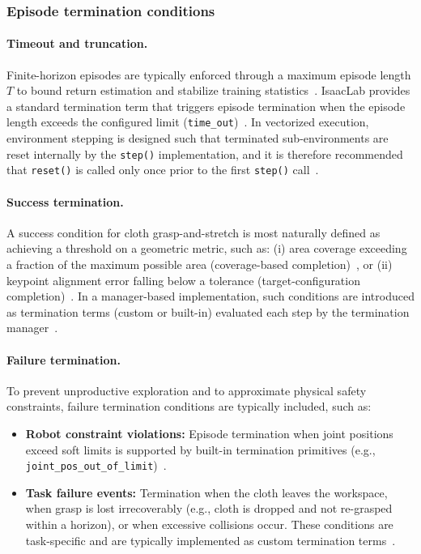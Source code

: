 \subsubsection{Episode termination conditions}

\paragraph{Timeout and truncation.}
Finite-horizon episodes are typically enforced through a maximum episode length $T$ to bound return estimation and stabilize training statistics~\cite{SuttonBarto2018}. IsaacLab provides a standard termination term that triggers episode termination when the episode length exceeds the configured limit (\texttt{time\_out})~\cite{isaaclab_mdp_terms_api}. In vectorized execution, environment stepping is designed such that terminated sub-environments are reset internally by the \texttt{step()} implementation, and it is therefore recommended that \texttt{reset()} is called only once prior to the first \texttt{step()} call~\cite{isaaclab_envs_api}.

\paragraph{Success termination.}
A success condition for cloth grasp-and-stretch is most naturally defined as achieving a threshold on a geometric metric, such as:
(i) area coverage exceeding a fraction of the maximum possible area (coverage-based completion)~\cite{Lin2021SoftGym}, or
(ii) keypoint alignment error falling below a tolerance (target-configuration completion)~\cite{Lin2021SoftGym}. In a manager-based implementation, such conditions are introduced as termination terms (custom or built-in) evaluated each step by the termination manager~\cite{isaaclab_mdp_terms_api,isaaclab_managers_api}.

\paragraph{Failure termination.}
To prevent unproductive exploration and to approximate physical safety constraints, failure termination conditions are typically included, such as:
\begin{itemize}
    \item \textbf{Robot constraint violations:} Episode termination when joint positions exceed soft limits is supported by built-in termination primitives (e.g., \texttt{joint\_pos\_out\_of\_limit})~\cite{isaaclab_mdp_terms_api}.
    \item \textbf{Task failure events:} Termination when the cloth leaves the workspace, when grasp is lost irrecoverably (e.g., cloth is dropped and not re-grasped within a horizon), or when excessive collisions occur. These conditions are task-specific and are typically implemented as custom termination terms~\cite{isaaclab_task_design_workflows}. %
\end{itemize}

